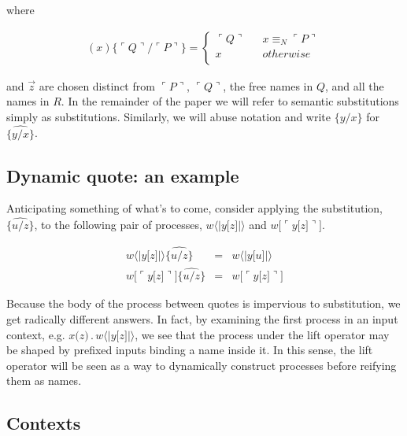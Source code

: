 \documentclass[]{entcs}
\newcommand{\lliftb}{\langle\!|}
\newcommand{\rliftb}{|\!\rangle}
\newcommand{\lpquote}{\ulcorner}
\newcommand{\rpquote}{\urcorner}
\newcommand{\id}[1]{\texttt{#1}}
\newcommand{\concat}{\mathbin{.}}
\newcommand{\nameeq}{\mathbin{\equiv_N}}
\newcommand{\lift}[2]{#1 \lliftb #2 \rliftb}
\newcommand{\quotep}[1]{\lpquote #1 \rpquote}
\newcommand{\substn}[2]{\id{\{} #1 / #2 \id{\}}}
\newcommand{\psubstn}[2]{\widehat{\substn{#1}{#2}}}
\begin{document}
where

\begin{eqnarray}
(x)\id{\{} \lpquote Q \rpquote / \lpquote P \rpquote \id{\}}            = 
		\left\{ 
			\begin{array}{ccc}
				\lpquote Q \rpquote & & x \nameeq \lpquote P \rpquote \\
                                x & & otherwise \\
			\end{array}
		\right. \nonumber
\end{eqnarray}

and $\vec{z}$ are chosen distinct from $\quotep{P}$, $\quotep{Q}$, the free
names in $Q$, and all the names in $R$. In the remainder of the paper
we will refer to semantic substitutions simply as
substitutions. Similarly, we will abuse notation and write
$\substn{y}{x}$ for $\psubstn{y}{x}$.

\subsection{ Dynamic quote: an example }

Anticipating something of what's to come, consider applying the
substitution, $\widehat{\id{\{}u / z \id{\}}}$, to the following pair
of processes, $\lift{w}{y \id{[}z\id{]}}$ and $w\id{[} \lpquote
y\id{[}z\id{]} \rpquote \id{]}$.

\begin{eqnarray}
	\lift{w}{y \id{[}z\id{]}}\widehat{\id{\{}u / z \id{\}}}
		& = &
		\lift{w}{y \id{[}u\id{]}} \nonumber\\
	w\id{[} \lpquote y\id{[}z\id{]} \rpquote \id{]} \widehat{ \id{\{}u / z \id{\}} }
		& = &
		w\id{[} \lpquote y\id{[}z\id{]} \rpquote \id{]} \nonumber
\end{eqnarray}

Because the body of the process between quotes is impervious to
substitution, we get radically different answers. In fact, by
examining the first process in an input context, e.g. $x \id{(} z
\id{)}\concat \lift{w}{y
\id{[}z\id{]}}$, we see that the process under the lift operator may
be shaped by prefixed inputs binding a name inside it. In this sense,
the lift operator will be seen as a way to dynamically construct
processes before reifying them as names.

\subsection{Contexts}
\end{document}

